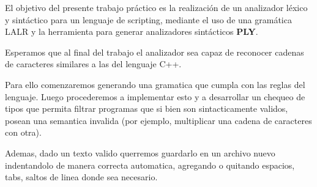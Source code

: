 El objetivo del presente trabajo práctico es la realización de un analizador léxico y sintáctico para un lenguaje de scripting, mediante el uso de una gramática LALR y la herramienta para generar analizadores sintácticos \textbf{PLY}.

Esperamos que al final del trabajo el analizador sea capaz de reconocer cadenas de caracteres similares a las del lenguaje C++.

Para ello comenzaremos generando una gramatica que cumpla con las reglas del lenguaje. Luego procederemos a implementar esto y a desarrollar un chequeo de tipos que permita filtrar programas que si bien son sintacticamente validos, posean una semantica invalida (por ejemplo, multiplicar una cadena de caracteres con otra).

Ademas, dado un texto valido querremos guardarlo en un archivo nuevo indentandolo de manera correcta automatica, agregando o quitando espacios, tabs, saltos de linea donde sea necesario.

